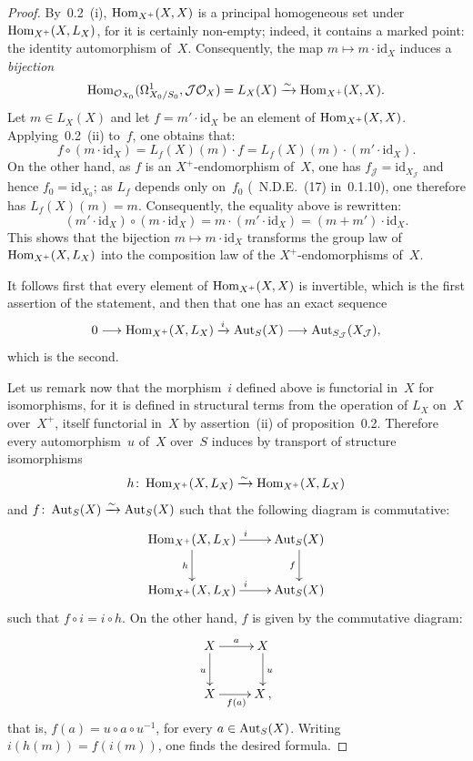 \begin{proof}
By~0.2~(i), \(\operatorname{Hom}_{X^{+}}(X,X)\) is a principal homogeneous set under
\(\operatorname{Hom}_{X^{+}}(X,L_{X})\), for it is certainly non-empty; indeed, it contains
a marked point: the identity automorphism of~\(X\).%
{\renewcommand{\thefootnote}{(25)}}
Consequently, the map \(m\mapsto m\cdot\mathrm{id}_{X}\) induces a
\emph{bijection}
\[
\operatorname{Hom}_{\mathcal{O}_{X_{0}}}(\Omega^{1}_{X_{0}/S_{0}},\mathcal{J}\mathcal{O}_{X})
=
L_{X}(X)
\xrightarrow{\sim}
\operatorname{Hom}_{X^{+}}(X,X).
\]
Let \(m\in L_{X}(X)\) and let \(f=m'\cdot\mathrm{id}_{X}\) be an element of
\(\operatorname{Hom}_{X^{+}}(X,X)\). Applying~0.2~(ii) to~\(f\), one obtains that:
\[
f\circ(m\cdot\mathrm{id}_{X})
=
L_{f}(X)(m)\cdot f
=
L_{f}(X)(m)\cdot(m'\cdot\mathrm{id}_{X}).
\]
On the other hand, as \(f\) is an \(X^{+}\)-endomorphism of~\(X\), one has
\(f_{\mathcal{J}}=\mathrm{id}_{X_{\mathcal{J}}}\) and hence
\(f_{0}=\mathrm{id}_{X_{0}}\); as \(L_{f}\) depends only on~\(f_{0}\)
(\cf\ N.D.E.~(17) in~0.1.10), one therefore has \(L_{f}(X)(m)=m\).
Consequently, the equality above is rewritten:
\[
(m'\cdot\mathrm{id}_{X})\circ(m\cdot\mathrm{id}_{X})
=
m\cdot(m'\cdot\mathrm{id}_{X})
=
(m+m')\cdot\mathrm{id}_{X}.
\]
This shows that the bijection \(m\mapsto m\cdot\mathrm{id}_{X}\) transforms
the group law of \(\operatorname{Hom}_{X^{+}}(X,L_{X})\) into the composition law of the
\(X^{+}\)-endomorphisms of~\(X\).

It follows first that every element of \(\operatorname{Hom}_{X^{+}}(X,X)\) is invertible,
which is the first assertion of the statement, and then that one has an exact
sequence
\[
0 \longrightarrow
\operatorname{Hom}_{X^{+}}(X,L_{X})
\xrightarrow{i}
\operatorname{Aut}_{S}(X)
\longrightarrow
\operatorname{Aut}_{S_{\mathcal{J}}}(X_{\mathcal{J}}),
\]
which is the second.

Let us remark now that the morphism~\(i\) defined above is functorial in~\(X\)
for isomorphisms, for it is defined in structural terms from the operation
of \(L_{X}\) on~\(X\) over~\(X^{+}\), itself functorial in~\(X\) by
assertion~(ii) of proposition~0.2.%
{\renewcommand{\thefootnote}{(26)}}
Therefore every automorphism~\(u\) of~\(X\) over~\(S\) induces by transport of
structure isomorphisms
\[
h\colon\operatorname{Hom}_{X^{+}}(X,L_{X})\xrightarrow{\sim}\operatorname{Hom}_{X^{+}}(X,L_{X})
\]
and \(f\colon\operatorname{Aut}_{S}(X)\xrightarrow{\sim}\operatorname{Aut}_{S}(X)\) such that the following diagram is
commutative:
\[
\xymatrix{
\Hom_{X^{+}}(X,L_{X}) \ar[r]^{i} \ar[d]_{h}
  & \Aut_{S}(X) \ar[d]_{f} \\
\Hom_{X^{+}}(X,L_{X}) \ar[r]^{i}
  & \Aut_{S}(X)
}
\]
\ie such that \(f\circ i=i\circ h\). On the other hand, \(f\) is given by the
commutative diagram:
\[
\xymatrix{
X \ar[r]^{a} \ar[d]_{u} & X \ar[d]^{u} \\
X \ar[r]_{f(a)} & X\,,
}
\]
that is, \(f(a)=u\circ a\circ u^{-1}\), for every \(a\in\operatorname{Aut}_{S}(X)\).
Writing \(i(h(m))=f(i(m))\), one finds the desired formula.
\end{proof}

